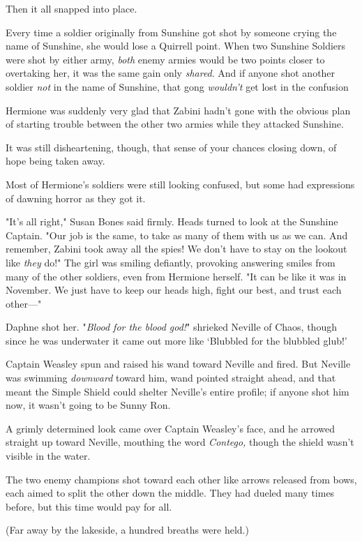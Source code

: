Then it all snapped into place.

Every time a soldier originally from Sunshine got shot by someone crying the
name of Sunshine, she would lose a Quirrell point. When two Sunshine Soldiers
were shot by either army, \emph{both} enemy armies would be two points closer
to overtaking her, it was the same gain only \emph{shared}. And if anyone shot
another soldier \emph{not} in the name of Sunshine, that gong \emph{wouldn't}
get lost in the confusion{\el}

Hermione was suddenly very glad that Zabini hadn't gone with the obvious plan
of starting trouble between the other two armies while they attacked Sunshine.

It was still disheartening, though, that sense of your chances closing down, of
hope being taken away.

Most of Hermione's soldiers were still looking confused, but some had
expressions of dawning horror as they got it.

"It's all right," Susan Bones said firmly. Heads turned to look at the Sunshine
Captain. "Our job is the same, to take as many of them with us as we can. And
remember, Zabini took away all the spies! We don't have to stay on the lookout
like \emph{they} do!" The girl was smiling defiantly, provoking answering
smiles from many of the other soldiers, even from Hermione herself. "It can be
like it was in November. We just have to keep our heads high, fight our best,
and trust each other\mbox{---}"

Daphne shot her.
\sbreak
"\emph{Blood for the blood god!}" shrieked Neville of Chaos, though since he
was underwater it came out more like `Blubbled for the blubbled glub!'

Captain Weasley spun and raised his wand toward Neville and fired. But Neville
was swimming \emph{downward} toward him, wand pointed straight ahead, and that
meant the Simple Shield could shelter Neville's entire profile; if anyone shot
him now, it wasn't going to be Sunny Ron.

A grimly determined look came over Captain Weasley's face, and he arrowed
straight up toward Neville, mouthing the word \emph{Contego,} though the shield
wasn't visible in the water.

The two enemy champions shot toward each other like arrows released from bows,
each aimed to split the other down the middle. They had dueled many times
before, but this time would pay for all.

(Far away by the lakeside, a hundred breaths were held.)

